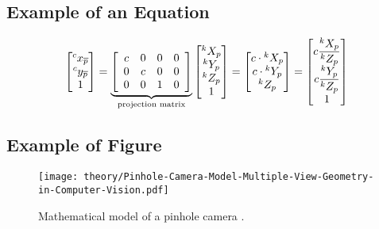 \documentclass[class=scrbook, crop=false]{standalone}
\begin{document}
    \subsection{Example of an Equation}
    \begin{equation}
        \label{eq::Central_Projection}
            \left[\begin{array}{@{}c@{}} {}^c x_{\overline{p}} \\ {}^c y_{\overline{p}} \\ 1 \end{array} \right] =
            \underbrace{\left[\begin{array}{cccc}
                c & 0 & 0 & 0 \\
                0 & c & 0 & 0 \\
                0 & 0 & 1 & 0
            \end{array} \right]}_{\text{projection matrix}}
            \left[\begin{array}{@{}c@{}} {}^k X_p \\ {}^k Y_p \\ {}^k Z_p \\ 1 \end{array} \right] =
            \left[\begin{array}{@{}c@{}} c \cdot {}^k X_p \\ c \cdot {}^k Y_p \\ {}^k Z_p \end{array} \right] =
            \left[\begin{array}{@{}c@{}} c \dfrac{{}^k X_p}{{}^k Z_p} \\ c \dfrac{{}^k Y_p}{{}^k Z_p} \\ 1 \end{array} \right]
    \end{equation}
    
    \subsection{Example of Figure}
    \begin{figure}[ht]
            \centering
            \texttt{[image: theory/Pinhole-Camera-Model-Multiple-View-Geometry-in-Computer-Vision.pdf]}
            \caption[Mathematical model of a pinhole camera]{Mathematical model of a pinhole camera \cite{Multiple_View_Geometry_in_Computer_Vision}.}
            \label{fig::Pinhole_Camera_Model}
        \end{figure}
    
\end{document}
